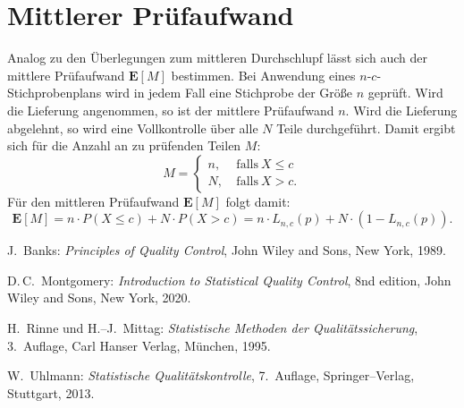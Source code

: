 \documentclass[a4paper,11pt,oneside]{article}
\begin{document}
\section{Mittlerer Prüfaufwand}

Analog zu den Überlegungen zum mittleren Durchschlupf lässt sich auch der mittlere Prüfaufwand $\mathbf{E}[M]$ bestimmen. Bei Anwendung eines $n$-$c$-Stichprobenplans wird in jedem Fall eine Stichprobe der Größe $n$ geprüft. Wird die Lieferung angenommen, so ist der mittlere Prüfaufwand $n$. Wird die Lieferung abgelehnt, so wird eine Vollkontrolle über alle $N$ Teile durchgeführt. Damit ergibt sich für die Anzahl an zu prüfenden Teilen $M$:
$$
M=
\begin{cases}
n, & ~\text{falls}~ X\le c\\
N, & ~\text{falls}~ X>c.
\end{cases}
$$
Für den mittleren Prüfaufwand $\mathbf{E}[M]$ folgt damit:
$$
\mathbf{E}[M]=
n\cdot P(X\le c) + N\cdot P(X>c)=
n\cdot L_{n,c}(p) + N\cdot(1-L_{n,c}(p)).
$$



\begin{thebibliography}{9}

J.~Banks:
\emph{Principles of Quality Control},
John Wiley and Sons, New York, 1989.

D.\,C.~Montgomery:
\emph{Introduction to Statistical Quality Control},
8nd edition, John Wiley and Sons, New York, 2020.

H.~Rinne und H.–J.~Mittag:
\emph{Statistische Methoden der Qualitätssicherung},
3.~Auflage, Carl Hanser Verlag, München, 1995.

W.~Uhlmann:
\emph{Statistische Qualitätskontrolle},
7.~Auflage, Springer–Verlag, Stuttgart, 2013.

\end{thebibliography}
\end{document}
